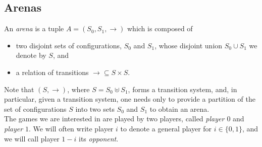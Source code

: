 \subsection{Arenas}

\begin{samepage}
An {\em arena} is a tuple $A=(S_0, S_1,{\rightarrow})$  which is composed of
\begin{itemize}
	\item two  disjoint  sets of configurations, $S_0$ and $S_1$, %
	whose disjoint union $S_0 \cup S_1$ we denote by $S$, and
	\item a relation of %
		transitions
	 ${\rightarrow} \subseteq S \times %
	 				S$. \\
\end{itemize}
\end{samepage}

\noindent
Note that $(S,{\rightarrow})$, where $S=S_0 \uplus S_1$, forms
a %
transition system, and, in particular, given a 
transition system,
one needs only to provide 
a partition of the set of configurations $S$ into two sets $S_0$ and $S_1$ to obtain an arena. \\



\noindent
The games we are interested in are played by two players, called {\em player $0$} and {\em player $1$}. We will often write player $i$ to denote a general player for $i \in \{0,1 \}$,
and we will call player $1-i$ its {\em opponent}. 

